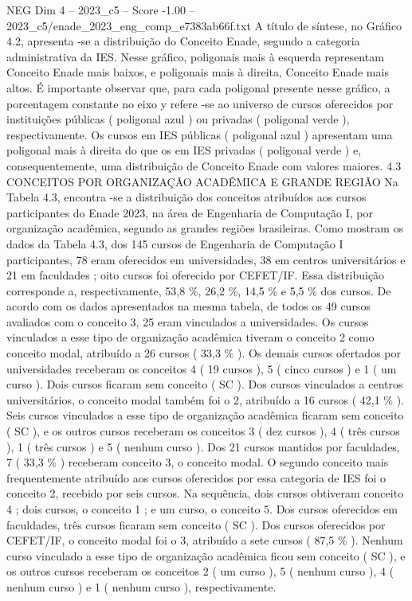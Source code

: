 \begin{textsample}{NEG Dim 4 – 2023\_c5 – Score -1.00 – 2023\_c5/enade\_2023\_eng\_comp\_e7383ab66f.txt}
A título de síntese, no Gráfico 4.2, apresenta -se a distribuição do Conceito Enade, segundo a categoria administrativa da IES.
Nesse gráfico, poligonais mais à esquerda representam Conceito Enade mais baixos, e poligonais mais à direita, Conceito Enade mais altos.
É importante observar que, para cada poligonal presente nesse gráfico, a porcentagem constante no eixo y refere -se ao universo de cursos oferecidos por instituições públicas ( poligonal azul ) ou privadas ( poligonal verde ), respectivamente.
Os cursos em IES públicas ( poligonal azul ) apresentam uma poligonal mais à direita do que os em IES privadas ( poligonal verde ) e, consequentemente, uma distribuição de Conceito Enade com valores maiores. 4.3 CONCEITOS POR ORGANIZAÇÃO ACADÊMICA E GRANDE REGIÃO Na Tabela 4.3, encontra -se a distribuição dos conceitos atribuídos aos cursos participantes do Enade 2023, na área de Engenharia de Computação I, por organização acadêmica, segundo as grandes regiões brasileiras.
Como mostram os dados da Tabela 4.3, dos 145 cursos de Engenharia de Computação I participantes, 78 eram oferecidos em universidades, 38 em centros universitários e 21 em faculdades ; oito cursos foi oferecido por CEFET/IF.
Essa distribuição corresponde a, respectivamente, 53,8 \%, 26,2 \%, 14,5 \% e 5,5 \% dos cursos.
De acordo com os dados apresentados na mesma tabela, de todos os 49 cursos avaliados com o conceito 3, 25 eram vinculados a universidades.
Os cursos vinculados a esse tipo de organização acadêmica tiveram o conceito 2 como conceito modal, atribuído a 26 cursos ( 33,3 \% ).
Os demais cursos ofertados por universidades receberam os conceitos 4 ( 19 cursos ), 5 ( cinco cursos ) e 1 ( um curso ).
Dois cursos ficaram sem conceito ( SC ).
Dos cursos vinculados a centros universitários, o conceito modal também foi o 2, atribuído a 16 cursos ( 42,1 \% ).
Seis cursos vinculados a esse tipo de organização acadêmica ficaram sem conceito ( SC ), e os outros cursos receberam os conceitos 3 ( dez cursos ), 4 ( três cursos ), 1 ( três cursos ) e 5 ( nenhum curso ).
Dos 21 cursos mantidos por faculdades, 7 ( 33,3 \% ) receberam conceito 3, o conceito modal.
O segundo conceito mais frequentemente atribuído aos cursos oferecidos por essa categoria de IES foi o conceito 2, recebido por seis cursos.
Na sequência, dois cursos obtiveram conceito 4 ; dois cursos, o conceito 1 ; e um curso, o conceito 5.
Dos cursos oferecidos em faculdades, três cursos ficaram sem conceito ( SC ).
Dos cursos oferecidos por CEFET/IF, o conceito modal foi o 3, atribuído a sete cursos ( 87,5 \% ).
Nenhum curso vinculado a esse tipo de organização acadêmica ficou sem conceito ( SC ), e os outros cursos receberam os conceitos 2 ( um curso ), 5 ( nenhum curso ), 4 ( nenhum curso ) e 1 ( nenhum curso ), respectivamente.

\end{textsample}
